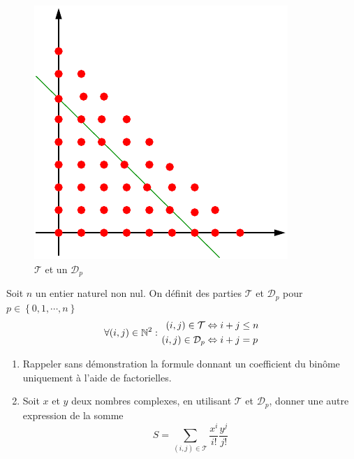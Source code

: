 \begin{figure}[htp]
 \centering
 \includegraphics{Esomm1_1.pdf}
 \caption{$\mathcal T$ et un $\mathcal{D}_p$}
 \label{fig:Esomm1_1}
\end{figure}

Soit $n$ un entier naturel non nul. On définit des parties $\mathcal{T}$ et $\mathcal{D}_p$ pour $p\in\left\lbrace 0,1,\cdots , n\right\rbrace$
\begin{displaymath}
 \forall (i,j)\in \mathbb{N}^2 :
\left. 
\begin{aligned}
 (i,j) \in \mathcal T &\Leftrightarrow i + j \leq n \\
 (i,j) \in \mathcal{D}_p &\Leftrightarrow i + j =p 
\end{aligned}
\right. 
\end{displaymath}
\begin{enumerate}
 \item Rappeler sans démonstration la formule donnant un coefficient du binôme uniquement à l'aide de factorielles.
 \item Soit $x$ et $y$ deux nombres complexes, en utilisant $\mathcal{T}$ et $\mathcal{D}_p$, donner une autre expression de la somme
\begin{displaymath}
 S = \sum_{(i,j)\in \mathcal T}\frac{x^i}{i!}\frac{y^j}{j!}
\end{displaymath}

\end{enumerate}
